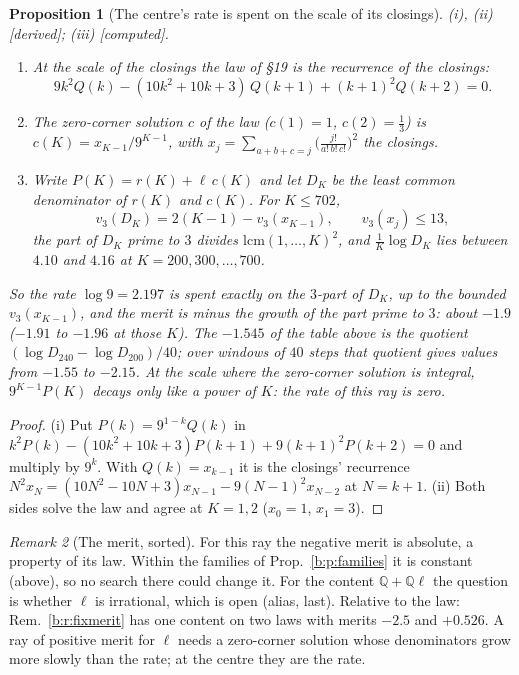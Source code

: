 \documentclass[11pt]{article}
\theoremstyle{plain}
\newtheorem{proposition}{Proposition}[section]
\theoremstyle{definition}
\theoremstyle{remark}
\newtheorem{remark}[proposition]{Remark}
\newcommand{\derived}{\textup{[derived]}}
\newcommand{\computed}{\textup{[computed]}}
\begin{document}
\begin{proposition}[The centre's rate is spent on the scale of its closings]\label{c:p:merit3}(i), (ii) \derived; (iii) \computed.\
\begin{enumerate}[label=(\roman*)]
\item At the scale of the closings the law of \S19 is the recurrence of the closings:
\[
9k^2Q(k)-(10k^2+10k+3)\,Q(k+1)+(k+1)^2Q(k+2)=0 .
\]
\item The zero-corner solution $c$ of the law ($c(1)=1$, $c(2)=\frac13$) is $c(K)=x_{K-1}/9^{K-1}$, with $x_j=\sum_{a+b+c=j}\big(\frac{j!}{a!\,b!\,c!}\big)^2$ the closings.
\item Write $P(K)=r(K)+\ell\,c(K)$ and let $D_K$ be the least common denominator of $r(K)$ and $c(K)$. For $K\le702$,
\[
v_3(D_K)=2(K-1)-v_3(x_{K-1}),\qquad v_3(x_j)\le13,
\]
the part of $D_K$ prime to $3$ divides $\mathrm{lcm}(1,\dots,K)^2$, and $\frac1K\log D_K$ lies between $4.10$ and $4.16$ at $K=200,300,\dots,700$.
\end{enumerate}
So the rate $\log9=2.197$ is spent exactly on the $3$-part of $D_K$, up to the bounded $v_3(x_{K-1})$, and the merit is minus the growth of the part prime to $3$: about $-1.9$ ($-1.91$ to $-1.96$ at those $K$). The $-1.545$ of the table above is the quotient $(\log D_{240}-\log D_{200})/40$; over windows of $40$ steps that quotient gives values from $-1.55$ to $-2.15$. At the scale where the zero-corner solution is integral, $9^{K-1}P(K)$ decays only like a power of $K$: the rate of this ray is zero.
\end{proposition}

\begin{proof}
(i) Put $P(k)=9^{1-k}Q(k)$ in $k^2P(k)-(10k^2+10k+3)P(k+1)+9(k+1)^2P(k+2)=0$ and multiply by $9^k$. With $Q(k)=x_{k-1}$ it is the closings' recurrence $N^2x_N=(10N^2-10N+3)x_{N-1}-9(N-1)^2x_{N-2}$ at $N=k+1$. (ii) Both sides solve the law and agree at $K=1,2$ ($x_0=1$, $x_1=3$).
\end{proof}

\begin{remark}[The merit, sorted]\label{c:r:merit21}
For this ray the negative merit is absolute, a property of its law. Within the families of Prop.~\ref{b:p:families} it is constant (above), so no search there could change it. For the content $\mathbb Q+\mathbb Q\ell$ the question is whether $\ell$ is irrational, which is open (alias, last). Relative to the law: Rem.~\ref{b:r:fixmerit} has one content on two laws with merits $-2.5$ and $+0.526$. A ray of positive merit for $\ell$ needs a zero-corner solution whose denominators grow more slowly than the rate; at the centre they are the rate.
\end{remark}
\end{document}
